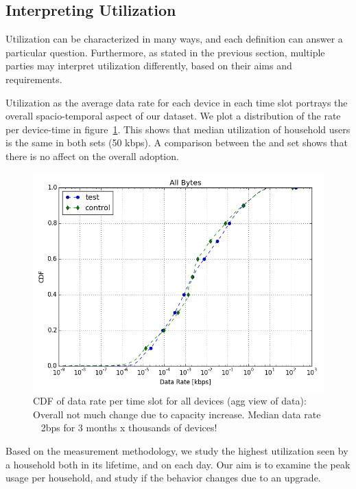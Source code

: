 \subsection{Interpreting Utilization}
\label{subsec:utilization}

Utilization can be characterized in many ways, and each definition can answer
a particular question. Furthermore, as stated in the previous section, multiple
parties may interpret utilization differently, based on their aims and requirements.


Utilization as the average data rate for each device in each time slot 
portrays the overall spacio-temporal aspect of our dataset. We plot a distribution
of the rate per device-time in figure~\ref{fig:CDF-data-rate-all}. This shows that
median utilization of household users is the same in both sets (50 kbps). A comparison
between the \test and \control set shows that there is no affect on the overall adoption.

\begin{figure}[ht!]
\centering
\includegraphics[width=0.90\linewidth]{figures/cdf-all-bytes.png}
  \caption{CDF of data rate per time slot for all devices (agg view of data): Overall not much change due to capacity increase. Median data rate ~ 2bps for 3 months x thousands of devices!}
  \label{fig:CDF-data-rate-all}
\end{figure}

Based on the measurement methodology, we study the highest utilization seen by a household
both in its lifetime, and on each day. Our aim is to examine the peak usage per household, and
study if the behavior changes due to an upgrade.

